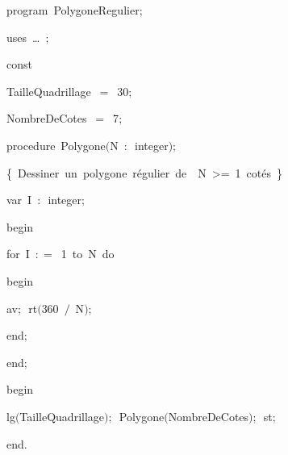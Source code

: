 
{
\parindent {}
\medskip

\carrenoir
\vspace{\neglskip}\mbox{\blc  \idt  \mcl program\idt \ PolygoneRegulier$;$
}\par 
\vspace{\neglskip}\mbox{\blc \blk\idt \mcl uses\idt \ \ldots\ $;$
}\par 
\medskip

\pagebreak[3] 
\vspace{\neglskip}\mbox{\blc  \blk\idt  \mcl const\idt }\par 
\vspace{\neglskip}\mbox{\blc  \blk\blk\idt  TailleQuadrillage\ $=$\ 30$;$}\par 
\vspace{\neglskip}\mbox{\blc  \blk\blk\idt  NombreDeCotes\ $=$\ 7$;$}\par 
\medskip

\pagebreak[3] 
\vspace{\neglskip}\mbox{\blc  \blk\idt  \mcl procedure\idt \ Polygone$($N\ $:$\ integer$)$$;$}\par 
\vspace{\neglskip}\mbox{\blc  \blk\blk\idt  \cmt  \{\ Dessiner\ un\ polygone\ régulier\ de\ \ N\ >=\ 1\ cotés\ \}\idt }\par 
\pagebreak[3] 
\vspace{\neglskip}\mbox{\blc  \blk\blk\blk\idt  \mcl var\idt \ I\ $:$\ integer$;$}\par 
\vspace{\neglskip}\mbox{\blc  \blk\idt  \mcl begin\idt }\par 
\pagebreak[3] 
\vspace{\neglskip}\mbox{\blc  \blk\blk\idt  \mcl for\idt \ I\ $:$$=$\ 1\ \mcl to\idt \ N\ \mcl do\idt }\par 
\vspace{\neglskip}\mbox{\blc  \blk\blk\blk\idt  \mcl begin\idt }\par 
\vspace{\neglskip}\mbox{\blc  \blk\blk\blk\blk\idt  av$;$\ rt$($360\ $/$\ N$)$$;$}\par 
\vspace{\neglskip}\mbox{\blc  \blk\blk\blk\idt  \mcl end\idt $;$}\par 
\vspace{\neglskip}\mbox{\blc  \blk\idt  \mcl end\idt $;$}\par 
\medskip

\vspace{\neglskip}\mbox{\blc  \idt  \mcl begin\idt }\par 
\vspace{\neglskip}\mbox{\blc  \blk\idt  lg$($TailleQuadrillage$)$$;$\ Polygone$($NombreDeCotes$)$$;$\ st$;$}\par 
\vspace{\neglskip}\mbox{\blc  \idt  \mcl end\idt $.$}\par 

\medskip }

